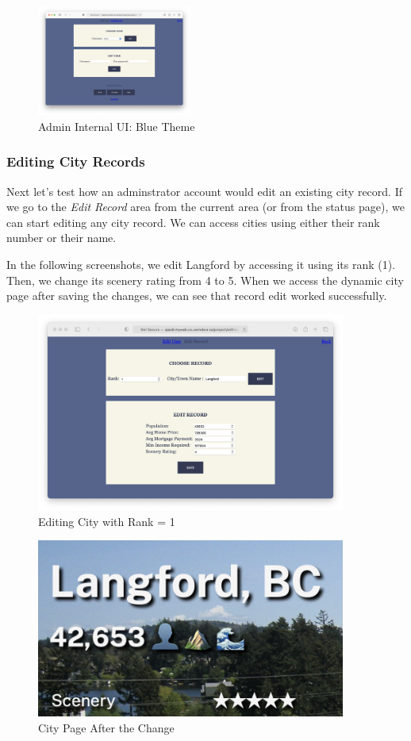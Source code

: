 \documentclass[12pt, letterpaper]{article}
\begin{document}
\begin{figure}[htbp]
\centering
\includegraphics[width=2in]{images/30-journey-a03c.png}
\caption{Admin Internal UI: Blue Theme}
\end{figure}


\newpage
\subsubsection*{Editing City Records}
Next let's test how an adminstrator account would edit an existing city record. If we go to the \textit{Edit Record} area from the current area (or from the status page), we can start editing any city record. We can access cities using either their rank number or their name.

In the following screenshots, we edit Langford by accessing it using its rank (1). Then, we change its scenery rating from 4 to 5. When we access the dynamic city page after saving the changes, we can see that record edit worked successfully.

\begin{figure}[htbp]
\centering
\includegraphics[width=4in]{images/30-journey-a04a.png}
\caption{Editing City with Rank = 1}
\end{figure}

\begin{figure}[htbp]
\centering
\includegraphics[width=4in]{images/30-journey-a04b.png}
\caption{City Page After the Change}
\end{figure}
\end{document}
